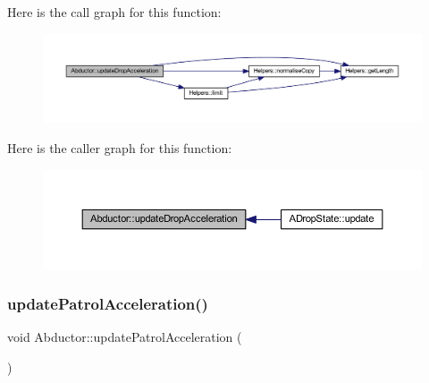 Here is the call graph for this function\+:
\nopagebreak
\begin{figure}[H]
\begin{center}
\leavevmode
\includegraphics[width=350pt]{class_abductor_aab823ab3fd94214f90b003661e036d03_cgraph}
\end{center}
\end{figure}
Here is the caller graph for this function\+:
\nopagebreak
\begin{figure}[H]
\begin{center}
\leavevmode
\includegraphics[width=350pt]{class_abductor_aab823ab3fd94214f90b003661e036d03_icgraph}
\end{center}
\end{figure}
\mbox{\label{class_abductor_a24cc63afd005eef7d1ed694933a2c2a0}} 
\subsubsection{\texorpdfstring{update\+Patrol\+Acceleration()}{updatePatrolAcceleration()}}
{\footnotesize\ttfamily void Abductor\+::update\+Patrol\+Acceleration (\begin{DoxyParamCaption}{ }\end{DoxyParamCaption})}

